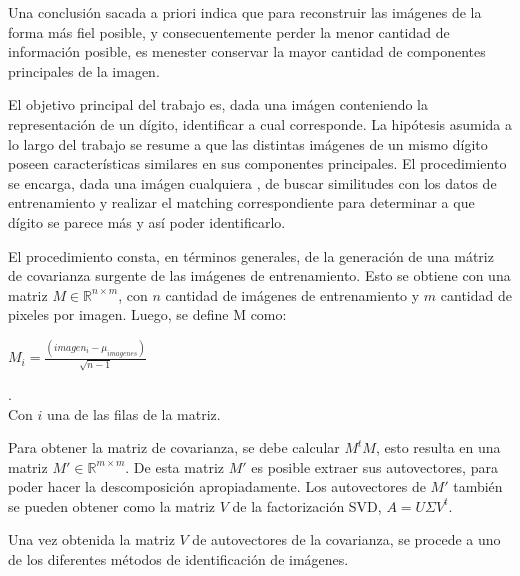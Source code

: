 Una conclusi\'on sacada a priori indica que para reconstruir las im\'agenes de la forma m\'as fiel posible,
y consecuentemente perder la menor cantidad de informaci\'on posible, es menester conservar la mayor cantidad
de componentes principales de la imagen.

El objetivo principal del trabajo es, dada una im\'agen conteniendo la representaci\'on de un d\'igito,
identificar a cual corresponde. La hip\'otesis asumida a lo largo del trabajo se
resume a que las distintas im\'agenes de un mismo d\'igito poseen caracter\'isticas 
similares en sus componentes principales. El procedimiento se encarga, dada una im\'agen cualquiera
, de buscar similitudes con los datos de entrenamiento y realizar el matching correspondiente
para determinar a que d\'igito se parece m\'as y as\'i poder identificarlo.

El procedimiento consta, en t\'erminos generales, de la generaci\'on de una 
m\'atriz de covarianza surgente de las im\'agenes de entrenamiento. 
Esto se obtiene con una matriz $M \in \mathbb{R}^{n \times m}$, con $n$ cantidad
de im\'agenes de entrenamiento y $m$ cantidad de pixeles por imagen. Luego, se define M como:
\\

\centerline{$M_i = \frac{(imagen_i - \mu_{imagenes})}{\sqrt{n-1}}$}.
\\
Con $i$ una de las filas de la matriz.

Para obtener la matriz de covarianza, se debe calcular $M^t M$, esto resulta en una matriz $M' \in \mathbb{R}^{m \times m}$.
De esta matriz $M'$ es posible extraer sus autovectores, para poder hacer la descomposici\'on apropiadamente.
Los autovectores de $M'$ tambi\'en se pueden obtener como la matriz $V$ de la factorizaci\'on SVD, $A=U\Sigma V^t$.

Una vez obtenida la matriz $V$ de autovectores de la covarianza, se procede a uno de los diferentes m\'etodos de
identificaci\'on de im\'agenes.
